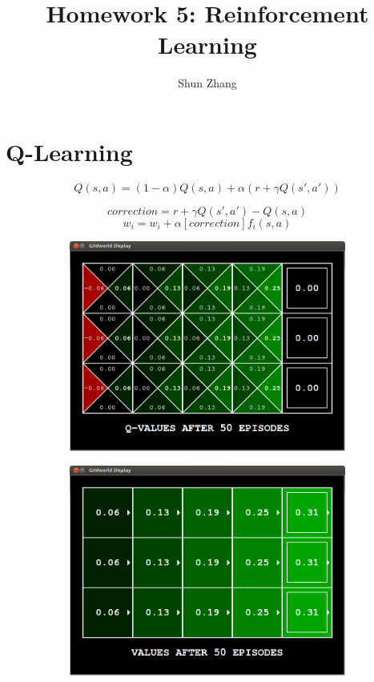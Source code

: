 \documentclass[11pt]{article}
\title{Homework 5: Reinforcement Learning}
\author{Shun Zhang}
\date{}
\begin{document}
\maketitle

\section{Q-Learning}

$$Q(s, a) = (1 - \alpha) Q(s, a) + \alpha (r + \gamma Q(s', a'))$$

$$correction = r + \gamma Q(s', a') - Q(s, a)$$
$$w_i = w_i + \alpha [correction] f_i(s, a)$$

\begin{figure}[h]
\centering
\begin{subfigure}{0.9\textwidth}
	\includegraphics[width=\textwidth]{figure/sidewalk}
\end{subfigure}
\begin{subfigure}{0.9\textwidth}
	\includegraphics[width=\textwidth]{figure/sidewalk_v}
\end{subfigure}
\label{fig:rep}
\end{figure}
\end{document}
